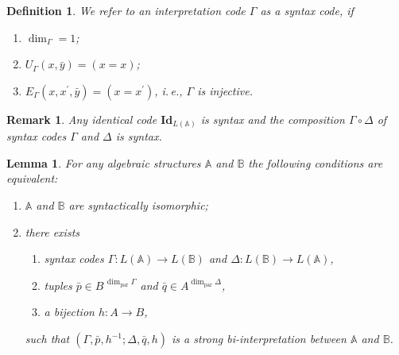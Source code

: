 \documentclass[12pt]{article}
\newtheorem{lemma}{Lemma}
\newtheorem{remark}{Remark}
\newtheorem{definition}{Definition}
\theoremstyle{definition}
\def\MA{{\mathbb{A}}}
\def\MB{{\mathbb{B}}}
\def\param{{\mathrm{par}}}
\def\Id{{\mathbf{Id}}}
\begin{document}
\begin{definition}
   We refer to an interpretation code $\Gamma$ as a {\em syntax code}, if 
    \begin{enumerate}
        \item $\dim_\Gamma=1$;
        \item $U_\Gamma(x,\bar y)=(x=x)$;
        \item $E_\Gamma(x,x^\prime,\bar y)=(x=x^\prime)$, i.\,e., $\Gamma$ is injective.
    \end{enumerate}
\end{definition}

\begin{remark}\label{remark:syntax}
Any identical code $\Id_{L(\MA)}$ is syntax and the composition $\Gamma\circ\Delta$ of syntax codes $\Gamma$ and $\Delta$ is syntax.
\end{remark}

\begin{lemma}\label{le:syn}
For any algebraic structures $\MA$ and $\MB$ the following conditions are equivalent:
\begin{enumerate}[label=(\arabic*)]
    \item $\MA$ and $\MB$ are syntactically isomorphic;
    \item there exists
    \begin{enumerate}
        \item syntax codes $\Gamma: L(\MA)\to L(\MB)$ and $\Delta\colon L(\MB)\to L(\MA)$,
        \item tuples $\bar p\in B^{\,\dim_\param \Gamma}$ and $\bar q\in A^{\dim_\param\Delta}$,
        \item a bijection $h\colon A\to B$,
    \end{enumerate}
     such that $(\Gamma,\bar p,h^{-1};\Delta,\bar q,h)$ is a strong bi-interpretation between $\MA$ and $\MB$.
\end{enumerate}
\end{lemma}
\end{document}
